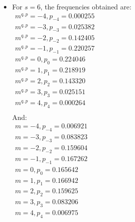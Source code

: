 \begin{enumerate}
\begin{itemize}
\item
For $s = 6$, the frequencies obtained are:\\
$
\begin{array}{l}
m^{q,p} = -4, p_{-4} = 0.000255 \\
m^{q,p} = -3, p_{-3} = 0.025382 \\
m^{q,p} = -2, p_{-2} = 0.142405 \\
m^{q,p} = -1, p_{-1} = 0.220257 \\
m^{q,p} = 0, p_{0} = 0.224046 \\
m^{q,p} = 1, p_{1} = 0.218919 \\
m^{q,p} = 2, p_{2} = 0.143320 \\
m^{q,p} = 3, p_{3} = 0.025151 \\
m^{q,p} = 4, p_{4} = 0.000264 \\
\end{array}
$
\\And: \\
$
\begin{array}{l}
m = -4, p_{-4} = 0.006921 \\
m = -3, p_{-3} = 0.083823 \\
m = -2, p_{-2} = 0.159604 \\
m = -1, p_{-1} = 0.167262 \\
m = 0, p_{0} = 0.165642 \\
m = 1, p_{1} = 0.166942 \\
m = 2, p_{2} = 0.159625 \\
m = 3, p_{3} = 0.083206 \\
m = 4, p_{4} = 0.006975 \\

\end{array}
$
\\


\end{itemize}
\end{enumerate}

